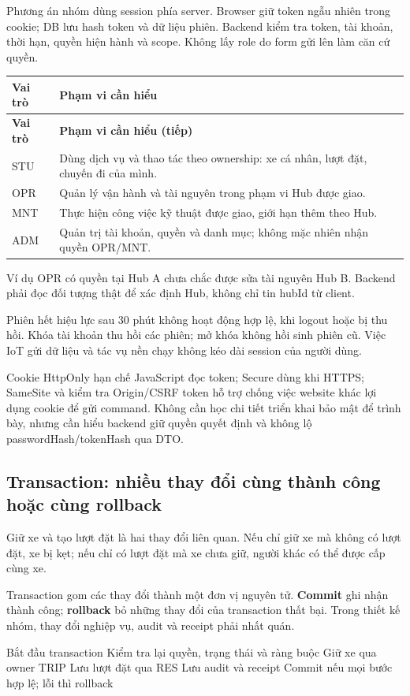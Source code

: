 \documentclass[12pt,a4paper]{article}
\newcommand{\Term}[1]{\textbf{#1}}
\newenvironment{PairTable}[2]{%
  \begin{longtable}{|L{39mm}|L{106mm}|}\hline
  \textbf{#1} & \textbf{#2}\\\hline\endfirsthead
  \hline\textbf{#1} & \textbf{#2 (tiếp)}\\\hline\endhead
}{\end{longtable}}
\begin{document}
Phương án nhóm dùng session phía server. Browser giữ token ngẫu nhiên trong cookie; DB lưu hash token và dữ liệu phiên. Backend kiểm tra token, tài khoản, thời hạn, quyền hiện hành và scope. Không lấy role do form gửi lên làm căn cứ quyền.

\begin{PairTable}{Vai trò}{Phạm vi cần hiểu}
STU & Dùng dịch vụ và thao tác theo ownership: xe cá nhân, lượt đặt, chuyến đi của mình.\\\hline
OPR & Quản lý vận hành và tài nguyên trong phạm vi Hub được giao.\\\hline
MNT & Thực hiện công việc kỹ thuật được giao, giới hạn thêm theo Hub.\\\hline
ADM & Quản trị tài khoản, quyền và danh mục; không mặc nhiên nhận quyền OPR/MNT.\\\hline
\end{PairTable}

Ví dụ OPR có quyền tại Hub A chưa chắc được sửa tài nguyên Hub B. Backend phải đọc đối tượng thật để xác định Hub, không chỉ tin hubId từ client.

Phiên hết hiệu lực sau 30 phút không hoạt động hợp lệ, khi logout hoặc bị thu hồi. Khóa tài khoản thu hồi các phiên; mở khóa không hồi sinh phiên cũ. Việc IoT gửi dữ liệu và tác vụ nền chạy không kéo dài session của người dùng.

Cookie HttpOnly hạn chế JavaScript đọc token; Secure dùng khi HTTPS; SameSite và kiểm tra Origin/CSRF token hỗ trợ chống việc website khác lợi dụng cookie để gửi command. Không cần học chi tiết triển khai bảo mật để trình bày, nhưng cần hiểu backend giữ quyền quyết định và không lộ passwordHash/tokenHash qua DTO.

\subsection{Transaction: nhiều thay đổi cùng thành công hoặc cùng rollback}
Giữ xe và tạo lượt đặt là hai thay đổi liên quan. Nếu chỉ giữ xe mà không có lượt đặt, xe bị kẹt; nếu chỉ có lượt đặt mà xe chưa giữ, người khác có thể được cấp cùng xe.

Transaction gom các thay đổi thành một đơn vị nguyên tử. \Term{Commit} ghi nhận thành công; \Term{rollback} bỏ những thay đổi của transaction thất bại. Trong thiết kế nhóm, thay đổi nghiệp vụ, audit và receipt phải nhất quán.

\begin{Flow}
Bắt đầu transaction
  Kiểm tra lại quyền, trạng thái và ràng buộc
  Giữ xe qua owner TRIP
  Lưu lượt đặt qua RES
  Lưu audit và receipt
Commit nếu mọi bước hợp lệ; lỗi thì rollback
\end{Flow}
\end{document}
